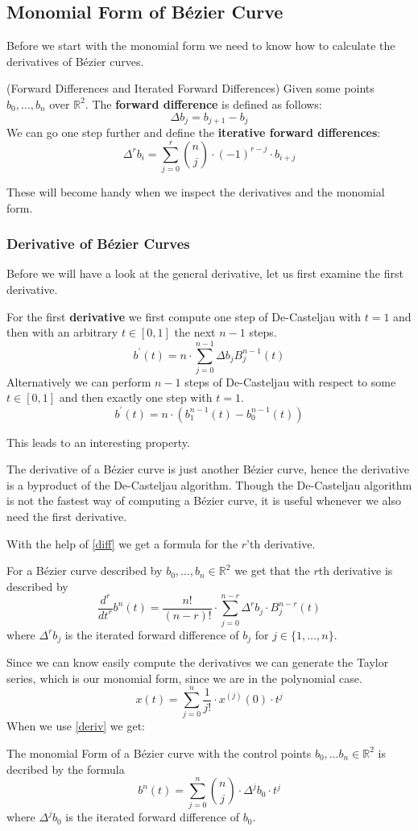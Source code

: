 \subsection{Monomial Form of Bézier Curve}
Before we start with the monomial form we need to know how to calculate the derivatives of Bézier curves.
\begin{definition}\label{diff}(Forward Differences and Iterated Forward Differences)
Given some points $b_0, \dots, b_n$ over $\mathbb{R}^2$.
The \textbf{forward difference} is defined as follows:
\[\Delta b_j = b_{j+1} - b_j\]
We can go one step further and define the \textbf{iterative forward differences}:
\[\Delta^r b_i = \sum_{j=0}^r \binom{n}{j} \cdot (-1)^{r-j} \cdot b_{i+j}\]
\end{definition}
These will become handy when we inspect the derivatives and the monomial form.
\newpage
\subsubsection{Derivative of Bézier Curves}
Before we will have a look at the general derivative, let us first examine the first derivative.
\begin{theorem}
For the first \textbf{derivative} we first compute one step of De-Casteljau with $t=1$ and then with an arbitrary $t \in [0,1]$ the next $n-1$ steps.
\[b^\prime(t) = n \cdot \sum_{j=0}^{n-1} \Delta b_j B_j^{n-1}(t)\]
Alternatively we can perform $n-1$ steps of De-Casteljau with respect to some $t \in [0,1]$ and then exactly one step with $t=1$.
\[b^\prime(t) = n \cdot (b_1^{n-1}(t) - b_0^{n-1}(t))\]
\end{theorem}
This leads to an interesting property.
\begin{rem}
The derivative of a Bézier curve is just another Bézier curve, hence the derivative is a byproduct of the De-Casteljau algorithm. Though the De-Casteljau algorithm is not the fastest way of computing a Bézier curve, it is useful whenever we also need the first derivative.
\end{rem}
With the help of \cref{diff} we get a formula for the $r$'th derivative.
\begin{theorem}\label{deriv}
For a Bézier curve described by $b_0, \dots, b_n \in \mathbb{R}^2$ we get that the $r$th derivative is described by
\[\frac{d^r}{dt^r}b^n(t) = \frac{n!}{(n-r)!} \cdot \sum_{j=0}^{n-r} \Delta^r b_j \cdot B_j^{n-r}(t)\]
where $\Delta^r b_j$ is the iterated forward difference of $b_j$ for $j \in \{1, \dots, n\}$.
\end{theorem}
Since we can know easily compute the derivatives we can generate the Taylor series, which is our monomial form, since we are in the polynomial case.
\[x(t) = \sum_{j=0}^n \frac{1}{j!} \cdot x^{(j)}(0) \cdot t^j \]
When we use \cref{deriv} we get:
\newpage
\begin{theorem}
The monomial Form of a Bézier curve with the control points $b_0, \dots b_n \in \mathbb{R}^2$ is decribed by the formula
\[b^n(t) = \sum_{j=0}^n \binom{n}{j} \cdot \Delta^j b_0 \cdot t^j\]
where $\Delta^j b_0$ is the iterated forward difference of $b_0$.
\end{theorem}

